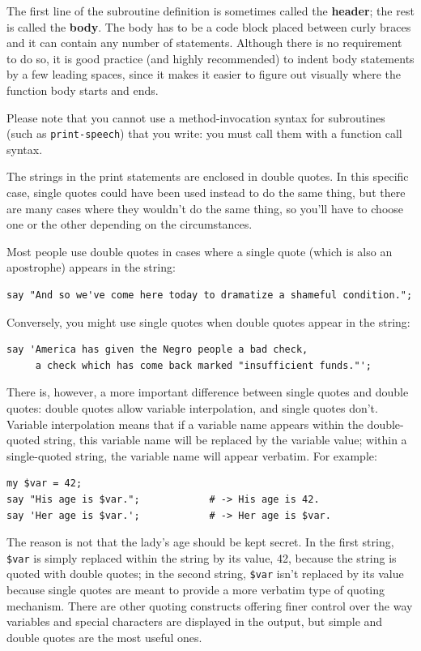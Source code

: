 The first line of the subroutine definition is sometimes called 
the {\bf header}; the rest is called the {\bf body}.  The body 
has to be a code block placed between curly braces and it can contain
any number of statements. Although there is no requirement to do 
so, it is good practice (and highly recommended) to indent body 
statements by a few leading spaces, since it makes it easier to 
figure out visually where the function body starts and ends.


Please note that you cannot use a method-invocation syntax 
for subroutines (such as \verb"print-speech") that you write: 
you must call them with a function call syntax.

The strings in the print statements are enclosed in double
quotes.  In this specific case, single quotes could have been 
used instead to do the same thing, but there are many cases 
where they wouldn't do the same thing, so you'll have to 
choose one or the other depending on the circumstances.


Most people use double quotes in cases where a single 
quote (which is also an apostrophe) appears in the string:
\begin{verbatim}
say "And so we've come here today to dramatize a shameful condition.";
\end{verbatim}
%
Conversely, you might use single quotes when double quotes 
appear in the string:
\begin{verbatim}
say 'America has given the Negro people a bad check, 
     a check which has come back marked "insufficient funds."';
\end{verbatim}
%
There is, however, a more important difference between single quotes 
and double quotes: double quotes allow variable interpolation, and 
single quotes don't.  Variable interpolation means that if a 
variable name appears within the double-quoted string, this 
variable name will be replaced by the variable value; within a 
single-quoted string, the variable name will appear verbatim. 
For example:
%
\begin{verbatim}
my $var = 42;
say "His age is $var.";            # -> His age is 42.
say 'Her age is $var.';            # -> Her age is $var.
\end{verbatim}
%
The reason is not that the lady's age should be kept secret. 
In the first string, \verb'$var' is simply replaced within the 
string by its value, 42, because the string is quoted with double 
quotes; in the second string, \verb'$var' isn't replaced by 
its value because single 
quotes are meant to provide a more verbatim type of quoting 
mechanism. There are other quoting constructs offering finer 
control over the way variables and special characters are 
displayed in the output, but simple and double quotes are the most 
useful ones.

